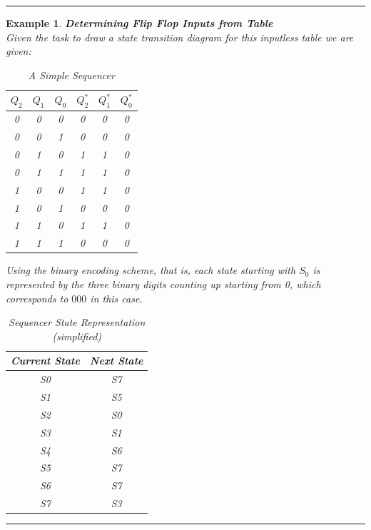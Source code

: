 \documentclass[12pt]{article}
\newtheorem{example}{Example}
\newenvironment{examp}
{
	\vspace{.5cm}
	\hrule
\begin{example}\upshape}
	{\hrule
		\vspace{0.5cm}
\end{example}}
\begin{document}
\begin{examp}
	\vspace{.5mm}
	\textbf{Determining Flip Flop Inputs from Table}\\
	Given the task to draw a state transition diagram for this inputless table we
	are given:
	\begin{table}[H]
		\centering
		\begin{tabular}{|c|c|c|c|c|c|}
			\hline
			\(Q_2\) & \(Q_1\) & \(Q_0\) & \(Q_2^*\) & \(Q_1^*\) & \(Q_0^*\) \\
			\hline
			0       & 0       & 0       & 0         & 0         & 0         \\
			0       & 0       & 1       & 0         & 0         & 0         \\
			0       & 1       & 0       & 1         & 1         & 0         \\
			0       & 1       & 1       & 1         & 1         & 0         \\
			1       & 0       & 0       & 1         & 1         & 0         \\
			1       & 0       & 1       & 0         & 0         & 0         \\
			1       & 1       & 0       & 1         & 1         & 0         \\
			1       & 1       & 1       & 0         & 0         & 0         \\
			\hline
		\end{tabular}
		\caption{A Simple Sequencer}
	\end{table}
	Using the binary encoding scheme, that is, each state starting with \(S_0\) is
	represented by the three binary digits counting up starting from 0, which
	corresponds to \(000\) in this case.
	
	\begin{table}[H]
		\centering
		\begin{tabular}{|c|c|}
			\hline
			Current State & Next State \\
			\hline
			S0            & S7         \\
			S1            & S5         \\
			S2            & S0         \\
			S3            & S1         \\
			S4            & S6         \\ 
			S5            & S7         \\ 
			S6            & S7         \\ 
			S7            & S3         \\ 
			\hline
		\end{tabular}
		\caption{Sequencer State Representation (simplified)}
	\end{table}
	
\end{examp}
\end{document}
